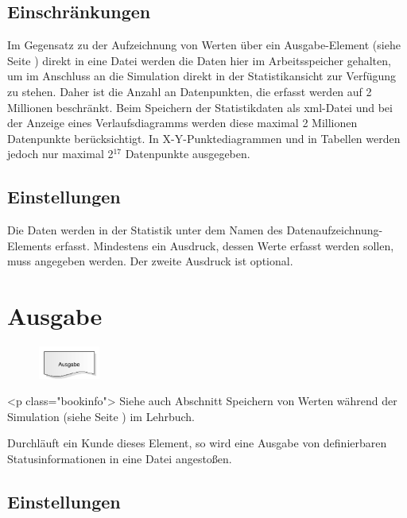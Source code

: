 \subsection*{Einschränkungen}

Im Gegensatz zu der Aufzeichnung von Werten über ein Ausgabe-Element (siehe Seite \pageref{ref:ModelElementOutput}) 
direkt in eine Datei werden die Daten hier im Arbeitsspeicher gehalten, um im Anschluss an die Simulation
direkt in der Statistikansicht zur Verfügung zu stehen. Daher ist die Anzahl an Datenpunkten, die erfasst
werden auf 2 Millionen beschränkt. Beim Speichern der Statistikdaten als xml-Datei und bei der Anzeige eines
Verlaufsdiagramms werden diese maximal 2 Millionen Datenpunkte berücksichtigt. In X-Y-Punktediagrammen und
in Tabellen werden jedoch nur maximal 2$^{17}$ Datenpunkte ausgegeben.

\subsection*{Einstellungen}

Die Daten werden in der Statistik unter dem Namen des Datenaufzeichnung-Elements erfasst. Mindestens
ein Ausdruck, dessen Werte erfasst werden sollen, muss angegeben werden. Der zweite Ausdruck ist
optional.


\section{Ausgabe}
\label{ref:ModelElementOutput}

\begin{figure}
\vspace{-22pt}
\includegraphics[width=2cm]{imageModelElementOutput.png}
\vspace{-22pt}
\end{figure}

<p class="bookinfo">
Siehe auch Abschnitt Speichern von Werten während der Simulation (siehe Seite \pageref{ref:book:9.3.3}) im Lehrbuch.

Durchläuft ein Kunde dieses Element, so wird eine Ausgabe von definierbaren Statusinformationen in eine
Datei angestoßen.

\subsection*{Einstellungen}

